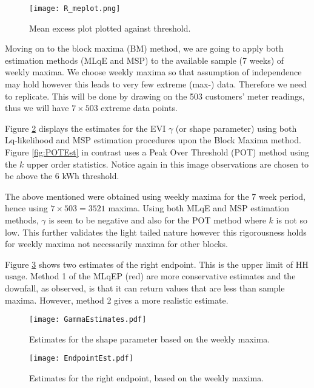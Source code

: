\documentclass[a4paper]{article}
\begin{document}
\begin{figure}
\centering
\texttt{[image: R\_meplot.png]}
\caption{\label{fig:r_me} Mean excess plot plotted against threshold.}
\end{figure}

Moving on to the block maxima (BM) method, we are going to apply both estimation methods (MLqE and MSP) to the available sample (7 weeks) of weekly maxima. We choose weekly maxima so that assumption of independence may hold however this leads to very few extreme (max-) data. Therefore we need to replicate. This will be done by drawing on the 503 customers' meter readings, thus we will have $7 \times 503$ extreme data points.

Figure \ref{fig:gammaEst} displays the estimates for the EVI $\gamma$ (or shape parameter) using both Lq-likelihood and MSP estimation procedures upon the Block Maxima method. Figure \ref{fig:POTEst} in contrast uses a Peak Over Threshold (POT) method using the $k$ upper order statistics. Notice again in this image observations are chosen to be above the 6 kWh threshold.

The above mentioned were obtained using weekly maxima for the 7 week period, hence using $7 \times 503= 3521$ maxima. Using both MLqE and MSP estimation methods, $\gamma$ is seen to be negative and also for the POT method where $k$ is not so low. This further validates the light tailed nature however this rigorousness holds for weekly maxima not necessarily maxima for other blocks. 

Figure \ref{fig:EndPointEst}  shows two estimates of the right endpoint. This is the upper limit of HH usage. Method 1 of the MLqEP (red) are more conservative estimates and the downfall, as observed, is that it can return values that are less than sample maxima. However, method 2 gives a more realistic estimate.

\begin{figure}
\begin{center}
\texttt{[image: GammaEstimates.pdf]}
\caption{Estimates for the shape parameter based on the weekly maxima.} \label{fig:gammaEst}
\end{center}
\end{figure}

\begin{figure}
\begin{center}
\texttt{[image: EndpointEst.pdf]}
\caption{Estimates for the right endpoint, based on the weekly maxima.} \label{fig:EndPointEst}
\end{center}
\end{figure}
\end{document}
